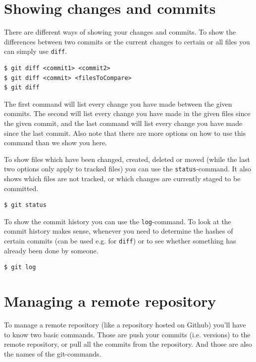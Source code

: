 \documentclass[a4paper, 12pt]{article}
\begin{document}
	\section{Showing changes and commits}
		
		There are different ways of showing your changes and commits. To show the differences between two commits or the current changes to certain or all files you can simply use \lstinline|diff|.
		
		\begin{lstlisting}
$ git diff <commit1> <commit2>
$ git diff <commit> <filesToCompare>
$ git diff
		\end{lstlisting}
		
		The first command will list every change you have made between the given commits. The second will list every change you have made in the given files since the given commit, and the last command will list every change you have made since the last commit. Also note that there are more options on how to use this command than we show you here.
		\newpage
		
		To show files which have been changed, created, deleted or moved (while the last two options only apply to tracked files) you can use the \lstinline|status|-command. It also shows which files are not tracked, or which changes are currently staged to be committed.
		
		\begin{lstlisting}
$ git status
		\end{lstlisting}
		
		To show the commit history you can use the \lstinline|log|-command. To look at the commit history makes sense, whenever you need to determine the hashes of certain commits (can be used e.g. for \lstinline|diff|) or to see whether something has already been done by someone.
		
		\begin{lstlisting}
$ git log
		\end{lstlisting}
		
	\section{Managing a remote repository}
	
		To manage a remote repository (like a repository hosted on Github) you'll have to know two basic commands. Those are push your commits (i.e. versions) to the remote repository, or pull all the commits from the repository. And those are also the names of the git-commands.
		
\end{document}
